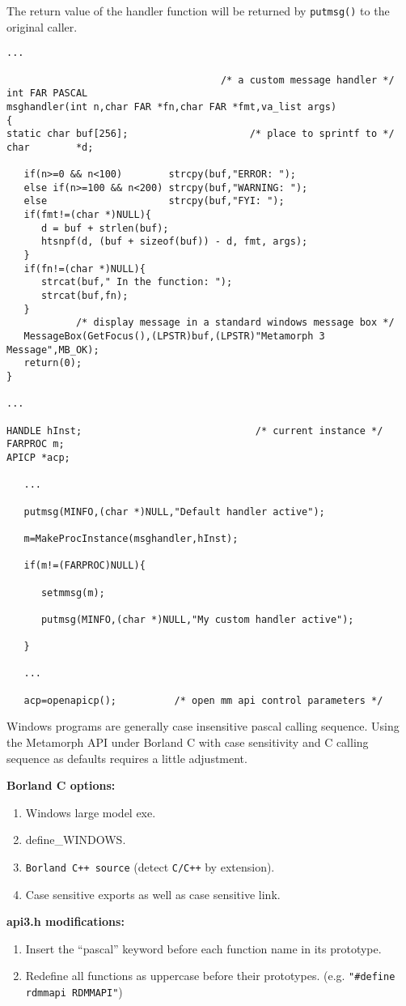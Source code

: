 The return value of the handler function will be returned by
\verb`putmsg()` to the original caller.

\EXAMPLE
\begin{verbatim}
...

                                     /* a custom message handler */
int FAR PASCAL
msghandler(int n,char FAR *fn,char FAR *fmt,va_list args)
{
static char buf[256];                     /* place to sprintf to */
char        *d;

   if(n>=0 && n<100)        strcpy(buf,"ERROR: ");
   else if(n>=100 && n<200) strcpy(buf,"WARNING: ");
   else                     strcpy(buf,"FYI: ");
   if(fmt!=(char *)NULL){
      d = buf + strlen(buf);
      htsnpf(d, (buf + sizeof(buf)) - d, fmt, args);
   }
   if(fn!=(char *)NULL){
      strcat(buf," In the function: ");
      strcat(buf,fn);
   }
            /* display message in a standard windows message box */
   MessageBox(GetFocus(),(LPSTR)buf,(LPSTR)"Metamorph 3 Message",MB_OK);
   return(0);
}

...

HANDLE hInst;                              /* current instance */
FARPROC m;
APICP *acp;

   ...

   putmsg(MINFO,(char *)NULL,"Default handler active");

   m=MakeProcInstance(msghandler,hInst);

   if(m!=(FARPROC)NULL){

      setmmsg(m);

      putmsg(MINFO,(char *)NULL,"My custom handler active");

   }

   ...

   acp=openapicp();          /* open mm api control parameters */

\end{verbatim}

Windows programs are generally case insensitive pascal calling sequence.
Using the Metamorph API under Borland C with case sensitivity and C
calling sequence as defaults requires a little adjustment.

{\bf Borland C options:}
\begin{enumerate}
\item Windows large model exe.
\item define\_WINDOWS.
\item \verb`Borland C++ source` (detect \verb`C/C++` by extension).
\item Case sensitive exports as well as case sensitive link.
\end{enumerate}

{\bf api3.h modifications:}
\begin{enumerate}
\item Insert the ``pascal'' keyword before each function name in its prototype.
\item Redefine all functions as uppercase before their prototypes.
(e.g. \verb`"#define rdmmapi RDMMAPI"`)
\end{enumerate}
%
